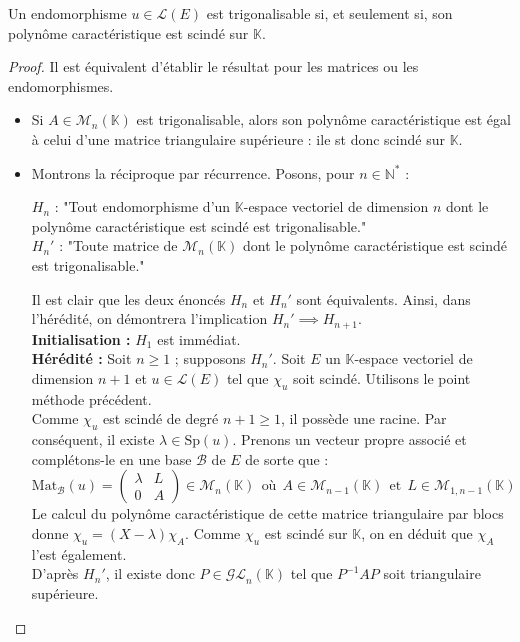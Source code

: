 \documentclass[french]{article}
\newcommand{\N}{\mathbb{N}}
\newcommand{\K}{\mathbb{K}}
\newcommand{\st}{^*}
\newcommand{\inv}{^{-1}}
\newcommand{\Sp}{\text{Sp}}
\theoremstyle{plain}
\theoremstyle{definition}
\theoremstyle{remark}
\begin{document}
	\begin{thm}%
		Un endomorphisme $u\in\mathcal{L}(E)$ est trigonalisable si, et seulement si, son polynôme caractéristique est scindé sur $\K$.
	\end{thm}
	\begin{proof}
		Il est équivalent d'établir le résultat pour les matrices ou les endomorphismes.
		\begin{itemize}
			\item Si $A\in\mathcal{M}_n(\K)$ est trigonalisable, alors son polynôme caractéristique est égal à celui d'une matrice triangulaire supérieure : ile st donc scindé sur $\K$.
			\item Montrons la réciproque par récurrence. Posons, pour $n\in\N\st$ :
			\begin{center}
				$H_n$ : "Tout endomorphisme d'un $\K$-espace vectoriel de dimension $n$ dont le polynôme caractéristique est scindé est trigonalisable."\\
				$H_n'$ : "Toute matrice de $\mathcal{M}_n(\K)$ dont le polynôme caractéristique est scindé est trigonalisable."
			\end{center}
			Il est clair que les deux énoncés $H_n$ et $H_n'$ sont équivalents. Ainsi, dans l'hérédité, on démontrera l'implication $H_n'\implies H_{n+1}$. \\
			\textbf{Initialisation :} $H_1$ est immédiat.\\
			\textbf{Hérédité :} Soit $n\geqslant 1$ ; supposons $H_n'$. Soit $E$ un $\K$-espace vectoriel de dimension $n+1$ et $u\in\mathcal{L}(E)$ tel que $\chi_u$ soit scindé. Utilisons le point méthode précédent.\\
			Comme $\chi_u$ est scindé de degré $n+1\geqslant1$, il possède une racine. Par conséquent, il existe $\lambda\in\Sp(u)$. Prenons un vecteur propre associé et complétons-le en une base $\mathcal{B}$ de $E$ de sorte que :
			$$\text{Mat}_\mathcal{B}(u)=\begin{pmatrix}
				\lambda&L\\
				0&A
			\end{pmatrix}\in\mathcal{M}_n(\K) \ \ \text{où}\ \ A\in\mathcal{M}_{n-1}(\K)\ \ \text{et} \ \ L\in\mathcal{M}_{1,n-1}(\K)$$
			Le calcul du polynôme caractéristique de cette matrice triangulaire par blocs donne $\chi_u=(X-\lambda)\chi_A$. Comme $\chi_u$ est scindé sur $\K$, on en déduit que $\chi_A$ l'est également.\\
			D'après $H_n'$, il existe donc $P\in\mathcal{GL}_n(\K)$ tel que $P\inv AP$ soit triangulaire supérieure.\\

\end{itemize}
\end{proof}
\end{document}
